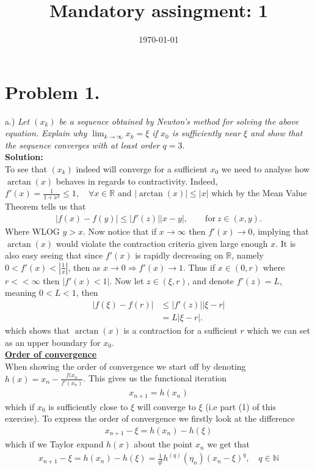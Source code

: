 \documentclass[12pt,
               a4paper,
               article,
               oneside,
               norsk,oldfontcommands]{memoir}
\date{\today}
\title{Mandatory assingment: 1}
\newcommand{\R}{\mathbb{R}}
\newcommand{\spaze}{\vspace{4mm}\\}
\begin{document}
\header{}
\section*{\centering Problem 1.}
a.) \emph{Let $(x_k)$ be a sequence obtained by Newton’s method for solving the above equation. Explain why $\lim_{k \to \infty} x_k = \xi$ if $x_0$ is sufficiently near $\xi$ and show that the sequence converges with at least order $q = 3.$} \spaze 
\textbf{Solution:} \spaze 
To see that $(x_k)$ indeed will converge for a sufficient $x_0$ we need to analyse how $\arctan(x)$ behaves in regards to contractivity. Indeed, $f'(x) = \frac{1}{1+x^2} \leq 1, \quad \forall x \in \R$ and $| \arctan(x) | \leq |x|$ which by the Mean Value Theorem tells us that 
\begin{align*}
|f(x) - f(y)| \leq |f'(z)| |x - y|, \qquad \text{for} \  z \in (x, y).
\end{align*}
Where WLOG $y > x$. Now notice that if $x \rightarrow \infty$ then $f'(x) \rightarrow 0$, implying that $\arctan(x)$ would violate the contraction criteria given large enough $x$. It is also easy seeing that since $f'(x)$ is rapidly decreasing on $\mathbb{R}$, namely $0< f'(x) < |\frac{1}{x}|$, then as $x \rightarrow 0 \Rightarrow f'(x) \rightarrow 1$. Thus if $x \in (0, r)$ where $r << \infty$ then $|f'(x) < 1|$. Now let $z \in (\xi, r)$, and denote $f'(z) = L$, meaning $ 0 < L < 1$, then  
\begin{align*}
|f(\xi) - f(r)| &\leq |f'(z)| |\xi - r| \\[5pt]
&= L  |\xi - r|.
\end{align*}
which shows that $\arctan(x)$ is a contraction for a sufficient $r$ which we can set as an upper boundary for $x_0$. \spaze 
\underline{\textbf{Order of convergence}}\spaze 
When showing the order of convergence we start off by denoting $h(x) = x_n - \frac{f(x_n}{f'(x_n)}$. This gives us the functional iteration 
\begin{align*}
x_{n+1} = h(x_n)
\end{align*}
which if $x_0$ is sufficiently close to $\xi$ will converge to $\xi$ (i.e part (1) of this exercise). To express the order of convergence we firstly look at the difference 
\begin{align*}
x_{n+1} - \xi = h(x_n) - h(\xi)
\end{align*}
which if we Taylor expand $h(x)$ about the point $x_n$ we get that 
\begin{align*}
x_{n+1} - \xi = h(x_n) - h(\xi) = \frac{1}{q!} h^{(q)} (\eta_{n})(x_n - \xi)^q, \quad q \in \mathbb{N}
\end{align*}
\end{document}
